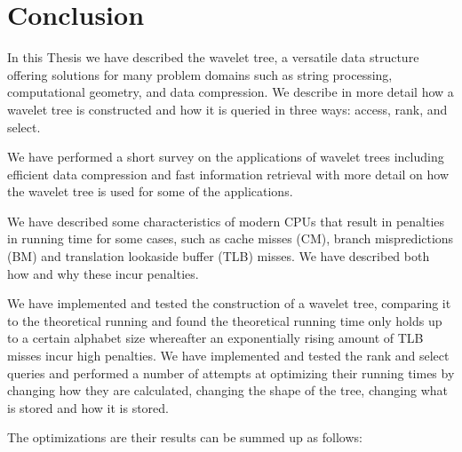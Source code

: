 \section{Conclusion}
In this Thesis we have described the wavelet tree, a versatile data structure offering solutions for many problem domains such as string processing, computational geometry, and data compression.
We describe in more detail how a wavelet tree is constructed and how it is queried in three ways: access, rank, and select.

We have performed a short survey on the applications of wavelet trees including efficient data compression and fast information retrieval with more detail on how the wavelet tree is used for some of the applications.

We have described some characteristics of modern CPUs that result in penalties in running time for some cases, such as cache misses (CM), branch mispredictions (BM) and translation lookaside buffer (TLB) misses.
We have described both how and why these incur penalties.

We have implemented and tested the construction of a wavelet tree, comparing it to the theoretical running and found the theoretical running time only holds up to a certain alphabet size whereafter an exponentially rising amount of TLB misses incur high penalties.
We have implemented and tested the rank and select queries and performed a number of attempts at optimizing their running times by changing how they are calculated, changing the shape of the tree, changing what is stored and how it is stored.

The optimizations are their results can be summed up as follows:

